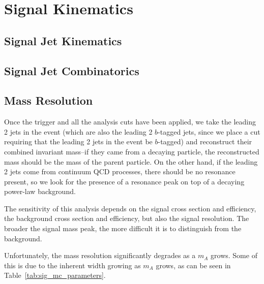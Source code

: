  

\chapter[Signal Kinematics]{Signal Kinematics}
 
\section{Signal Jet Kinematics}

\section{Signal Jet Combinatorics}

\section{Mass Resolution}
Once the trigger and all the analysis cuts have been applied, we take the leading 2 jets in the event (which are also the leading 2 $b$-tagged jets, since we place a cut requiring that the leading 2 jets in the event be $b$-tagged) and reconstruct their combined invariant mass--if they came from a decaying particle, the reconstructed mass should be the mass of the parent particle.  On the other hand, if the leading 2 jets come from continuum QCD processes, there should be no resonance present, so we look for the presence of a resonance peak on top of a decaying power-law background.

The sensitivity of this analysis depends on the signal cross section and efficiency, the background cross section and efficiency, but also the signal resolution.  The broader the signal mass peak, the more difficult it is to distinguish from the background.  

Unfortunately, the mass resolution significantly degrades as a $m_A$ grows.  Some of this is due to the inherent width growing as $m_A$ grows, as can be seen in Table~\ref{tab:sig_mc_parameters}.  

